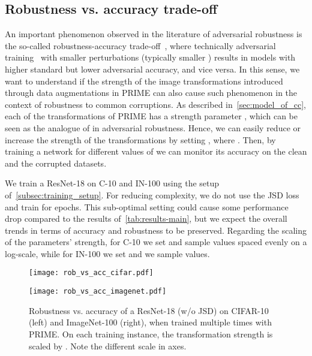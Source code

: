\documentclass[runningheads]{llncs}
\begin{document}
\subsection{Robustness vs. accuracy trade-off}
\label{subsec:robustness-accuracy-tradeoff}

An important phenomenon observed in the literature of adversarial robustness is the so-called robustness-accuracy trade-off~\cite{Fawzi_Analysis_MachineLearning,tsiprasRobustnessMayBe2018,RaghunathanUnderstanding}, where technically adversarial training~\cite{madryDeepLearningModels2018} with smaller perturbations (typically smaller ) results in models with higher standard but lower adversarial accuracy, and vice versa. In this sense, we want to understand if the strength of the image transformations introduced through data augmentations in PRIME can also cause such phenomenon in the context of robustness to common corruptions. As described in~\cref{sec:model_of_cc}, each of the transformations of PRIME has a strength parameter , which can be seen as the analogue of  in adversarial robustness. Hence, we can easily reduce or increase the strength of the transformations by setting , where . Then, by training a network for different values of  we can monitor its accuracy on the clean and the corrupted datasets.

We train a ResNet-18 on C-10 and IN-100 using the setup of~\cref{subsec:training_setup}. For reducing complexity, we do not use the JSD loss and train for  epochs. This sub-optimal setting could cause some performance drop compared to the results of~\cref{tab:results-main}, but we expect the overall trends in terms of accuracy and robustness to be preserved. Regarding the scaling of the parameters' strength, for C-10 we set  and sample  values spaced evenly on a log-scale, while for IN-100 we set  and we sample  values.

\begin{figure}[t]
\centering
    \begin{minipage}[c]{0.40\linewidth}
    \centering
    \texttt{[image: rob\_vs\_acc\_cifar.pdf]} 
\end{minipage}\;
    \begin{minipage}[c]{0.392\linewidth}
    \centering
    \texttt{[image: rob\_vs\_acc\_imagenet.pdf]}
    \end{minipage} 
    \caption{Robustness vs. accuracy of a ResNet-18 (w/o JSD) on CIFAR-10 (left) and ImageNet-100 (right), when trained multiple times with PRIME. On each training instance, the transformation strength is scaled by . Note the different scale in axes.}
    \vspace*{-2mm}
    \label{fig:rob_acc}
\end{figure}
\end{document}
